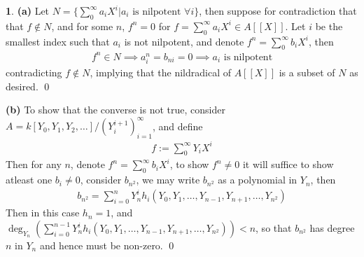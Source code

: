 \documentclass[11pt]{article}
\theoremstyle{definition}
\newtheorem{pb}{}
\newcommand{\set}[1]{\{#1\}}
\begin{document}
    \begin{pb}
        \textbf{(a)} Let \(N = \set{\sum_0^\infty a_iX^i \vert a_i \text{ is nilpotent } \forall i}\), then suppose for contradiction that that \(f \not \in N\), and for some \(n\), \(f^n = 0\) for \(f = \sum_0^\infty a_iX^i \in A[[X]]\). Let \(i\) be the smallest index such that \(a_i\) is not nilpotent, and denote \(f^n = \sum_0^\infty b_iX^i\), then 
        \begin{align*}
            f^n \in N \implies a_i^n = b_{ni} = 0 \implies a_i \text{ is nilpotent}
        \end{align*}
        contradicting \(f \not \in N\), implying that the nildradical of \(A[[X]]\) is a subset of \(N\) as desired. \qed


        \textbf{(b)} To show that the converse is not true, consider \(A = k[Y_0,Y_1,Y_2,\hdots]/(Y_i^{i+1})_{i=1}^\infty\), and define
        \begin{align*}
            f := \sum_0^\infty Y_iX^i
        \end{align*}
        Then for any \(n\), denote \(f^n = \sum_0^\infty b_iX^i\), to show \(f^n \neq 0\) it will suffice to show atleast one \(b_i \neq 0\), consider \(b_{n^2}\), we may write \(b_{n^2}\) as a polynomial in \(Y_n\), then
        \begin{align*}
            b_{n^2} = \sum_{i=0}^n Y_n^i h_i(Y_0,Y_1,\hdots,Y_{n-1},Y_{n+1},\hdots,Y_{n^2})
        \end{align*}
        Then in this case \(h_n = 1\), and \(\deg_{Y_n}(\sum_{i=0}^{n-1} Y_n^i h_i(Y_0,Y_1,\hdots,Y_{n-1},Y_{n+1},\hdots,Y_{n^2})) < n\), so that \(b_{n^2}\) has degree \(n\) in \(Y_n\) and hence must be non-zero. \qed
    \end{pb}
\end{document}
